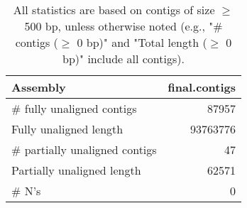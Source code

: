 \documentclass[12pt,a4paper]{article}
\begin{document}
\begin{table}[ht]
\begin{center}
\caption{All statistics are based on contigs of size $\geq$ 500 bp, unless otherwise noted (e.g., "\# contigs ($\geq$ 0 bp)" and "Total length ($\geq$ 0 bp)" include all contigs).}
\begin{tabular}{|l*{1}{|r}|}
\hline
Assembly & final.contigs \\ \hline
\# fully unaligned contigs & 87957 \\ \hline
Fully unaligned length & 93763776 \\ \hline
\# partially unaligned contigs & 47 \\ \hline
Partially unaligned length & 62571 \\ \hline
\# N's & 0 \\ \hline
\end{tabular}
\end{center}
\end{table}
\end{document}
